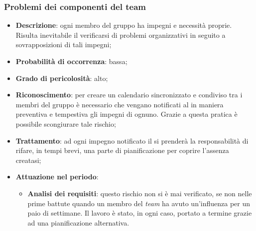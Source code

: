 		\subsubsection{Problemi dei componenti del team}
		\begin{itemize}
			\item \textbf{Descrizione}: ogni membro del gruppo ha impegni e necessità proprie. Risulta inevitabile il verificarsi di problemi organizzativi in seguito a sovrapposizioni di tali impegni;
			\item \textbf{Probabilità di occorrenza}: bassa;
			\item \textbf{Grado di pericolosità}: alto;
			\item \textbf{Riconoscimento}: per creare un calendario sincronizzato e condiviso tra i membri del gruppo è necessario che vengano notificati al \textit{\Res} in maniera preventiva e tempestiva gli impegni di ognuno. Grazie a questa pratica è possibile scongiurare tale rischio;
			\item \textbf{Trattamento}: ad ogni impegno notificato il \textit{\Res} si prenderà la responsabilità di rifare, in tempi brevi, una parte di pianificazione per coprire l'assenza creatasi;
			\item \textbf{Attuazione nel periodo}:
			\begin{itemize}
				\item \textbf{Analisi dei requisiti}: questo rischio non si è mai verificato, se non nelle prime battute quando un membro del \textit{team} ha avuto un'influenza per un paio di settimane. Il lavoro è stato, in ogni caso, portato a termine grazie ad una pianificazione alternativa.
			\end{itemize}
		\end{itemize}
		
